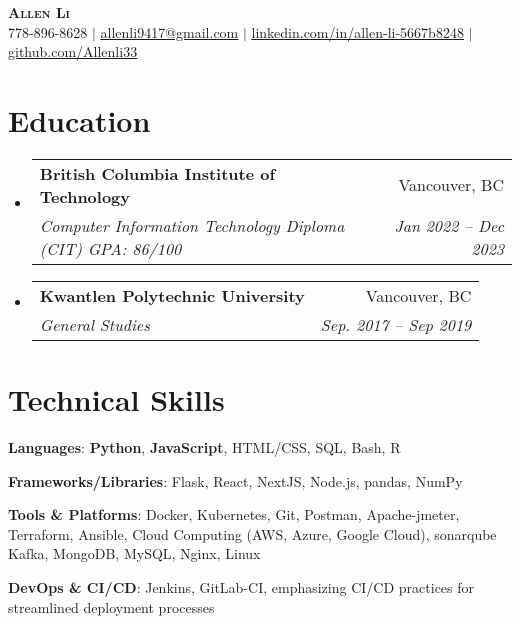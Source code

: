 \documentclass[letterpaper,11pt]{article}
\makeatletter
\newcommand{\resumeSubheading}[4]{
  \vspace{-2pt}\item
    \begin{tabular*}{0.97\textwidth}[t]{l@{\extracolsep{\fill}}r}
      \textbf{#1} & #2 \\
      \textit{\small#3} & \textit{\small #4} \\
    \end{tabular*}\vspace{-7pt}
}
\newcommand{\resumeSubHeadingListStart}{\begin{itemize}[leftmargin=0.15in, label={}]}
\newcommand{\resumeSubHeadingListEnd}{\end{itemize}}
\makeatother
\begin{document}
\begin{center}
    \textbf{\Huge \scshape Allen Li} \\ \vspace{1pt}
    \small 778-896-8628 $|$ \href{mailto:allenli9417@gmail.com}{\underline{allenli9417@gmail.com}} $|$ 
    \href{https://linkedin.com/in/allen-li-5667b8248}{\underline{linkedin.com/in/allen-li-5667b8248}} $|$
    \href{https://github.com/Allenli33}{\underline{github.com/Allenli33}}
\end{center}

\section{Education}
  \resumeSubHeadingListStart
    \resumeSubheading
      {British Columbia Institute of Technology}{Vancouver, BC}
      {Computer Information Technology Diploma (CIT) GPA: 86/100}{Jan 2022 -- Dec 2023}
    \resumeSubheading
      {Kwantlen Polytechnic University}{Vancouver, BC}
      {General Studies}{Sep. 2017 -- Sep 2019}
  \resumeSubHeadingListEnd

\section{Technical Skills}
 \begin{itemize}[leftmargin=0.15in, label={}]
    \small{\item{
     \textbf{Languages}{: \textbf{Python}, \textbf{JavaScript}, HTML/CSS, SQL, Bash, R} \\
     \vspace{2mm}  %

     \textbf{Frameworks/Libraries}{: Flask, React, NextJS, Node.js, pandas, NumPy} \\
     \vspace{2mm}  %

     \textbf{Tools \& Platforms}{: Docker, Kubernetes, Git, Postman, Apache-jmeter, Terraform, Ansible, Cloud Computing (AWS, Azure, Google Cloud), sonarqube Kafka, MongoDB, MySQL, Nginx, Linux} \\
     \vspace{2mm}  %

     \textbf{DevOps \& CI/CD}{: Jenkins, GitLab-CI, emphasizing CI/CD practices for streamlined deployment processes} \\
    }}
 \end{itemize}
\end{document}
